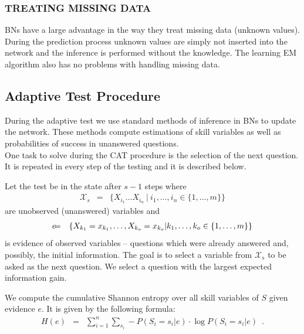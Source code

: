 \subsubsection{TREATING MISSING DATA}
BNs have a large advantage in the way they treat missing data (unknown values). During the prediction process unknown values are simply not inserted into the network and the inference is performed without the knowledge. The learning EM algorithm also has no problems with handling missing data.

\subsection{Adaptive Test Procedure}
During the adaptive test we use standard methods of inference in BNs to update the network. These methods compute estimations of skill variables as well as probabilities of success in unanswered questions.\\
One task to solve during the CAT procedure is the selection of the next question. It is repeated in every step of the testing and it is described below.

Let the test be in the state after $s-1$ steps where 
\begin{eqnarray*}
\mathcal{X}_s & = & \{X_{i_1}\ldots X_{i_n} \ | \ i_1,\ldots,i_n \in \{1,\ldots,m\}\}
\end{eqnarray*}
are unobserved (unanswered) variables and 
\small
\begin{eqnarray*}
\lefteqn{e} &= &\{X_{k_1} = x_{k_1},\ldots,X_{k_o} = x_{k_o} | k_1,\ldots,k_o \in \{1,\ldots,m\}\} 
\end{eqnarray*}
\normalsize
is evidence of observed variables -- questions which were already answered and, possibly, the initial information. 
The goal is to select a variable from $\mathcal{X}_s$ to be asked as the next question. 
We select a question with the largest expected information gain. 

We compute the cumulative Shannon entropy over all skill variables of $S$ given evidence $e$.
It is given by the following formula:
\begin{eqnarray*}
H(e) & = & \sum_{i = 1}^n \sum_{s_i} -P(S_i=s_i|e) \cdot \log P(S_i=s_i|e) \enspace .
\end{eqnarray*}

